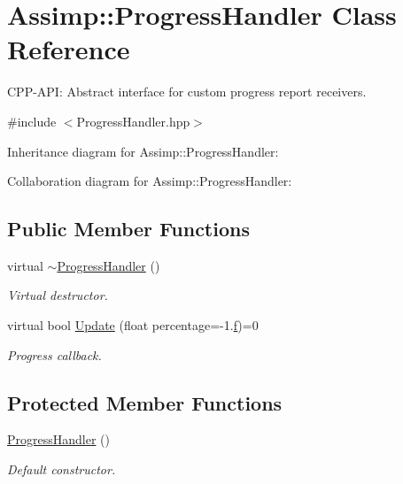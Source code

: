 \hypertarget{class_assimp_1_1_progress_handler}{\section{Assimp\-:\-:Progress\-Handler Class Reference}
\label{class_assimp_1_1_progress_handler}
}


C\-P\-P-\/\-A\-P\-I\-: Abstract interface for custom progress report receivers.  




{\ttfamily \#include $<$Progress\-Handler.\-hpp$>$}



Inheritance diagram for Assimp\-:\-:Progress\-Handler\-:


Collaboration diagram for Assimp\-:\-:Progress\-Handler\-:
\subsection*{Public Member Functions}
\begin{DoxyCompactItemize}
\item 
virtual \hyperlink{class_assimp_1_1_progress_handler_a3ec465a62e1feaae00f585ca0cffb81e}{$\sim$\-Progress\-Handler} ()
\begin{DoxyCompactList}\small\item\em Virtual destructor. \end{DoxyCompactList}\item 
virtual bool \hyperlink{class_assimp_1_1_progress_handler_ab08a1d300d434f6dd86ca41747cba448}{Update} (float percentage=-\/1.\hyperlink{_g_l_e_w_2glew_8h_aba8ad56949f59242bc167b073dae3715}{f})=0
\begin{DoxyCompactList}\small\item\em Progress callback. \end{DoxyCompactList}\end{DoxyCompactItemize}
\subsection*{Protected Member Functions}
\begin{DoxyCompactItemize}
\item 
\hyperlink{class_assimp_1_1_progress_handler_a53b192913e9904c674b851c46e1ea9e8}{Progress\-Handler} ()
\begin{DoxyCompactList}\small\item\em Default constructor. \end{DoxyCompactList}\end{DoxyCompactItemize}


